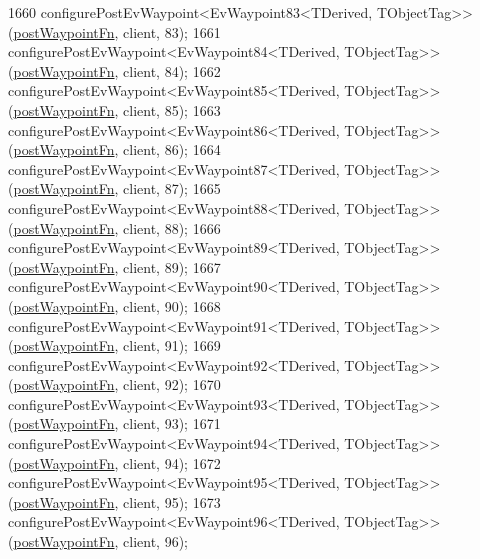 \begin{DoxyCode}
1660     configurePostEvWaypoint<EvWaypoint83<TDerived, TObjectTag>>(\hyperlink{classmove__base__z__client_1_1WaypointEventDispatcher_acc538eb7506c13f7cca2268a1742dadd}{postWaypointFn}, client, 83);
1661     configurePostEvWaypoint<EvWaypoint84<TDerived, TObjectTag>>(\hyperlink{classmove__base__z__client_1_1WaypointEventDispatcher_acc538eb7506c13f7cca2268a1742dadd}{postWaypointFn}, client, 84);
1662     configurePostEvWaypoint<EvWaypoint85<TDerived, TObjectTag>>(\hyperlink{classmove__base__z__client_1_1WaypointEventDispatcher_acc538eb7506c13f7cca2268a1742dadd}{postWaypointFn}, client, 85);
1663     configurePostEvWaypoint<EvWaypoint86<TDerived, TObjectTag>>(\hyperlink{classmove__base__z__client_1_1WaypointEventDispatcher_acc538eb7506c13f7cca2268a1742dadd}{postWaypointFn}, client, 86);
1664     configurePostEvWaypoint<EvWaypoint87<TDerived, TObjectTag>>(\hyperlink{classmove__base__z__client_1_1WaypointEventDispatcher_acc538eb7506c13f7cca2268a1742dadd}{postWaypointFn}, client, 87);
1665     configurePostEvWaypoint<EvWaypoint88<TDerived, TObjectTag>>(\hyperlink{classmove__base__z__client_1_1WaypointEventDispatcher_acc538eb7506c13f7cca2268a1742dadd}{postWaypointFn}, client, 88);
1666     configurePostEvWaypoint<EvWaypoint89<TDerived, TObjectTag>>(\hyperlink{classmove__base__z__client_1_1WaypointEventDispatcher_acc538eb7506c13f7cca2268a1742dadd}{postWaypointFn}, client, 89);
1667     configurePostEvWaypoint<EvWaypoint90<TDerived, TObjectTag>>(\hyperlink{classmove__base__z__client_1_1WaypointEventDispatcher_acc538eb7506c13f7cca2268a1742dadd}{postWaypointFn}, client, 90);
1668     configurePostEvWaypoint<EvWaypoint91<TDerived, TObjectTag>>(\hyperlink{classmove__base__z__client_1_1WaypointEventDispatcher_acc538eb7506c13f7cca2268a1742dadd}{postWaypointFn}, client, 91);
1669     configurePostEvWaypoint<EvWaypoint92<TDerived, TObjectTag>>(\hyperlink{classmove__base__z__client_1_1WaypointEventDispatcher_acc538eb7506c13f7cca2268a1742dadd}{postWaypointFn}, client, 92);
1670     configurePostEvWaypoint<EvWaypoint93<TDerived, TObjectTag>>(\hyperlink{classmove__base__z__client_1_1WaypointEventDispatcher_acc538eb7506c13f7cca2268a1742dadd}{postWaypointFn}, client, 93);
1671     configurePostEvWaypoint<EvWaypoint94<TDerived, TObjectTag>>(\hyperlink{classmove__base__z__client_1_1WaypointEventDispatcher_acc538eb7506c13f7cca2268a1742dadd}{postWaypointFn}, client, 94);
1672     configurePostEvWaypoint<EvWaypoint95<TDerived, TObjectTag>>(\hyperlink{classmove__base__z__client_1_1WaypointEventDispatcher_acc538eb7506c13f7cca2268a1742dadd}{postWaypointFn}, client, 95);
1673     configurePostEvWaypoint<EvWaypoint96<TDerived, TObjectTag>>(\hyperlink{classmove__base__z__client_1_1WaypointEventDispatcher_acc538eb7506c13f7cca2268a1742dadd}{postWaypointFn}, client, 96);

\end{DoxyCode}
